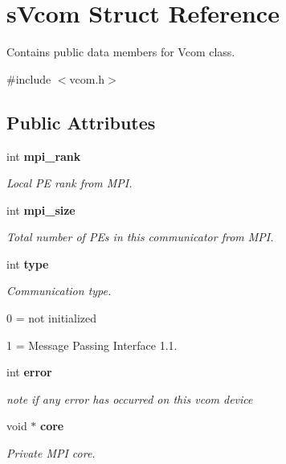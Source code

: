 \section{sVcom Struct Reference}
\label{a00001}


Contains public data members for Vcom class.  




{\ttfamily \#include $<$vcom.h$>$}

\subsection*{Public Attributes}
\begin{DoxyCompactItemize}
\item 
int {\bf mpi\_\-rank}
\begin{DoxyCompactList}\small\item\em Local PE rank from MPI. \item\end{DoxyCompactList}\item 
int {\bf mpi\_\-size}
\begin{DoxyCompactList}\small\item\em Total number of PEs in this communicator from MPI. \item\end{DoxyCompactList}\item 
int {\bf type}
\begin{DoxyCompactList}\small\item\em Communication type. \par
 0 = not initialized \par
 1 = Message Passing Interface 1.1. \item\end{DoxyCompactList}\item 
int {\bf error}
\begin{DoxyCompactList}\small\item\em note if any error has occurred on this vcom device \item\end{DoxyCompactList}\item 
void $\ast$ {\bf core}
\begin{DoxyCompactList}\small\item\em Private MPI core. \item\end{DoxyCompactList}\end{DoxyCompactItemize}


